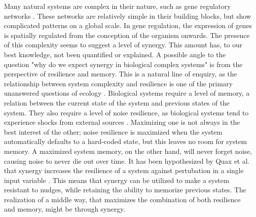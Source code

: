 \documentclass[../main.tex]{subfiles}
\begin{document}
Many natural systems are complex in their nature, such as gene regulatory networks \cite{}.
These networks are relatively simple in their building blocks, but show complicated patterns on a global scale.
In gene regulation, the expression of genes is spatially regulated from the conception of the organism onwards.
The presence of this complexity seems to suggest a level of synergy.
This amount has, to our best knowledge, not been quantified or explained.
A possible angle to the question "why do we expect synergy in biological complex systems" is from the perspective of resilience and memory.
This is a natural line of enquiry, as the relationship between system complexity and resilience is one of the primary unanswered questions of ecology \cite{}.
Biological systems require a level of memory, a relation between the current state of the system and previous states of the system. 
They also require a level of noise resilience, as biological systems tend to experience shocks from external sources \cite{peixoto2012emergence}.
Maximizing one is not always in the best interest of the other; noise resilience is maximized when the system automatically defaults to a hard-coded state, but this leaves no room for system memory.
A maximized system memory, on the other hand, will never forget noise, causing noise to never die out over time.
It has been hypothesized by Quax et al. that synergy increases the resilience of a system against pertubation in a single input variable \cite{quax2017quantifying}. 
This means that synergy can be utilized to make a system resistant to nudges, while retaining the ability to memorize previous states. 
The realization of a middle way, that maximizes the combination of both resilience and memory, might be through synergy.
\end{document}
